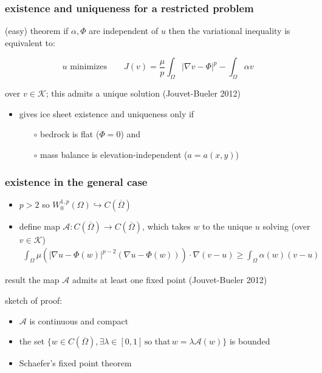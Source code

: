 \documentclass{beamer}
\begin{document}
\begin{frame}
  \frametitle{existence and uniqueness for a restricted problem} 

\begin{block}{(easy) theorem}
if $\alpha,\Phi$ are independent of $u$ then the variational inequality is equivalent to:

\begin{equation*}
u \text{ minimizes} \qquad J(v) = \frac{\mu}{p} \int_{\Omega} |\nabla v - \Phi |^p - \int_{\Omega}  \alpha v
\end{equation*}

over $v\in\mathcal{K}$; this admits a unique solution \hfill \scriptsize (Jouvet-Bueler 2012)
\end{block}

\begin{itemize}
\item gives ice sheet existence and uniqueness only if
  \begin{itemize}
  \item[$\circ$]  bedrock is flat ($\Phi = 0$) and
  \item[$\circ$]  mass balance is elevation-independent ($a=a(x,y)$)
  \end{itemize}
\end{itemize}
\end{frame}
 

\begin{frame} 
  \frametitle{ existence in the general case } 

\begin{itemize}
\item $p>2$ so $W^{1,p}_0 (\Omega) \hookrightarrow C(\overline{\Omega})$
\item define map $\mathcal{A}:C(\overline{\Omega}) \rightarrow C(\overline{\Omega})$,
which takes $w$ to the unique $u$ solving (over $v\in \mathcal{K}$)
\begin{align*}
\int_{\Omega}   \mu  \left( | \nabla u - \Phi(w) |^{p-2} 
( \nabla u - \Phi(w) )    \right)  \cdot \nabla ( v - u )  
\ge \int_{\Omega} \alpha(w) (  v -  u )
\end{align*}
\end{itemize}

\begin{block}{result}
the map $\mathcal{A}$ admits at least one fixed point \hfill \scriptsize (Jouvet-Bueler 2012)
\end{block}

\vfill
\scriptsize
sketch of proof:
\begin{itemize}
\item $\mathcal{A}$ is continuous and compact
\item the set $\{ w \in C(\overline{\Omega}), \exists \lambda \in [0,1]\, \text{so that} \,w = \lambda \mathcal{A}(w)\}$ is bounded 
\item Schaefer's fixed point theorem
\end{itemize}
\end{frame}
\end{document}
